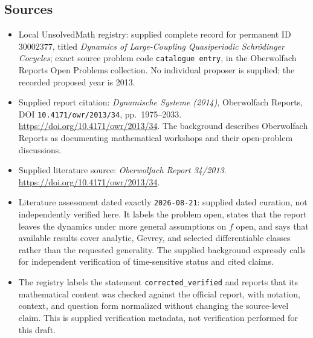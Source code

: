 \documentclass[11pt]{article}
\begin{document}
\subsection{Sources}
\begin{itemize}
\item Local UnsolvedMath registry: supplied complete record for permanent ID \(30002377\), titled \emph{Dynamics of Large-Coupling Quasiperiodic Schr\"odinger Cocycles}; exact source problem code \texttt{catalogue entry}, in the Oberwolfach Reports Open Problems collection. No individual proposer is supplied; the recorded proposed year is 2013.
\item Supplied report citation: \emph{Dynamische Systeme (2014)}, Oberwolfach Reports, DOI \texttt{10.4171/owr/2013/34}, pp.~1975--2033. \url{https://doi.org/10.4171/owr/2013/34}. The background describes Oberwolfach Reports as documenting mathematical workshops and their open-problem discussions.
\item Supplied literature source: \emph{Oberwolfach Report 34/2013}. \url{https://doi.org/10.4171/owr/2013/34}.
\item Literature assessment dated exactly \texttt{2026-08-21}: supplied dated curation, not independently verified here. It labels the problem open, states that the report leaves the dynamics under more general assumptions on \(f\) open, and says that available results cover analytic, Gevrey, and selected differentiable classes rather than the requested generality. The supplied background expressly calls for independent verification of time-sensitive status and cited claims.
\item The registry labels the statement \texttt{corrected\_verified} and reports that its mathematical content was checked against the official report, with notation, context, and question form normalized without changing the source-level claim. This is supplied verification metadata, not verification performed for this draft.
\end{itemize}
\end{document}
